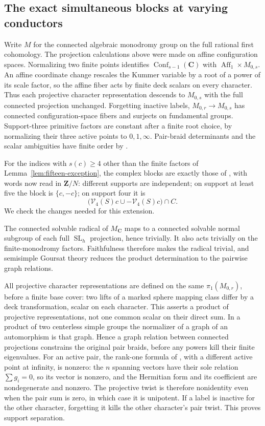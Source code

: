 \documentclass[11pt]{article}
\theoremstyle{definition}
\newcommand{\C}{\mathbf C}
\newcommand{\Z}{\mathbf Z}
\newcommand{\SL}{\operatorname{SL}}
\begin{document}
\subsection{The exact simultaneous blocks at varying conductors}
Write $M$ for the connected algebraic monodromy group on the full
rational first cohomology. The projection calculations above were made
on affine configuration spaces. Normalizing two finite points identifies
$\operatorname{Conf}_{s-1}(\C)$ with
$\operatorname{Aff}_1\times M_{0,s}$. An affine coordinate change
rescales the Kummer variable by a root of a power of its scale factor,
so the affine fiber acts by finite deck scalars on every character.
Thus each projective character representation descends to $M_{0,s}$
with the full connected projection unchanged. Forgetting inactive
labels, $M_{0,r}\to M_{0,s}$ has connected configuration-space fibers
and surjects on fundamental groups. Support-three primitive factors
are constant after a finite root choice, by normalizing their three
active points to $0,1,\infty$. Pair-braid determinants and the scalar
ambiguities have finite order by \cite[Corollary~2.7]{MN}.

For the indices with $s(c)\geq4$ other than the finite factors of
Lemma~\ref{lem:fifteen-exception}, the complex blocks are exactly those of
\cite[Section 3]{General}, with words now read in $\Z/N$:
different supports are independent; on support at least five the block
is $\{c,-c\}$; on support four it is
\[
 \bigl(\mathcal V_4(S)c\cup-\mathcal V_4(S)c\bigr)\cap C.
\]
We check the changes needed for this extension.

The connected solvable radical of $M_\C$ maps to a connected solvable
normal subgroup of each full $\SL_h$ projection, hence trivially.
It also acts trivially on the finite-monodromy factors. Faithfulness
therefore makes the radical trivial, and semisimple Goursat theory
reduces the product determination to the pairwise graph relations.

All projective character representations are defined on the same
$\pi_1(M_{0,r})$, before a finite base cover: two lifts of a marked
sphere mapping class differ by a deck transformation, scalar on each
character. This asserts a product of projective representations, not
one common scalar on their direct sum. In a product of two
centerless simple groups the normalizer of a graph of an automorphism
is that graph. Hence a graph relation between connected projections
constrains the original pair braids, before any powers kill their finite
eigenvalues. For an active pair, the rank-one formula of
\cite[Theorems 2.2 and 2.5]{MN}, with a different active point at
infinity, is nonzero: the $n$ spanning vectors have their sole relation
$\sum g_i=0$, so its vector is nonzero, and the Hermitian form and its
coefficient are nondegenerate and nonzero. The projective twist is
therefore nonidentity even when the pair sum is zero, in which case it
is unipotent. If a label is inactive for the other character, forgetting
it kills the other character's pair twist. This proves support separation.
\end{document}
